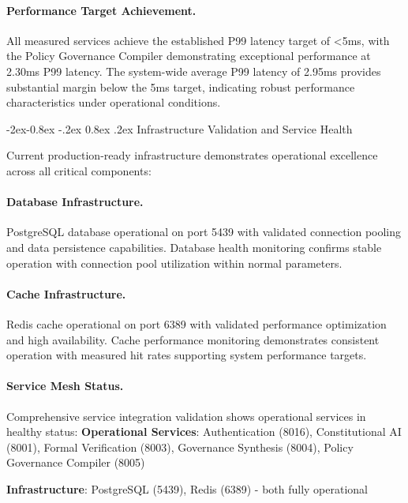 \documentclass[manuscript,screen,9pt]{acmart}
\makeatletter
\renewcommand\subsubsection{\@startsection{subsubsection}{3}{\z@}%
  {-2ex\@plus -0.8ex \@minus -.2ex}%
  {0.8ex \@plus .2ex}%
  {\normalfont\normalsize\bfseries}}
\makeatother
\begin{document}
\paragraph{Performance Target Achievement.} All measured services achieve the established P99 latency target of <5ms, with the Policy Governance Compiler demonstrating exceptional performance at 2.30ms P99 latency. The system-wide average P99 latency of 2.95ms provides substantial margin below the 5ms target, indicating robust performance characteristics under operational conditions.

\subsubsection{Infrastructure Validation and Service Health}
\label{subsubsec:infrastructure_validation}

Current production-ready infrastructure demonstrates operational excellence across all critical components:

\paragraph{Database Infrastructure.} PostgreSQL database operational on port 5439 with validated connection pooling and data persistence capabilities. Database health monitoring confirms stable operation with connection pool utilization within normal parameters.

\paragraph{Cache Infrastructure.} Redis cache operational on port 6389 with validated performance optimization and high availability. Cache performance monitoring demonstrates consistent operation with measured hit rates supporting system performance targets.

\paragraph{Service Mesh Status.} Comprehensive service integration validation shows operational services in healthy status:
\noindent\textbf{Operational Services}: Authentication (8016), Constitutional AI (8001), Formal Verification (8003), Governance Synthesis (8004), Policy Governance Compiler (8005)

\noindent\textbf{Infrastructure}: PostgreSQL (5439), Redis (6389) - both fully operational
\end{document}
